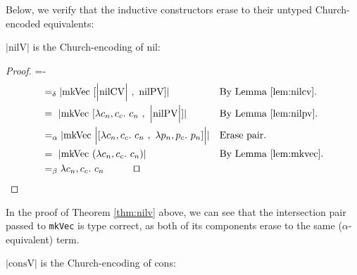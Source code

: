 \documentclass[a4paper,envcountsame,envcountsect]{llncs}
\newcommand{\eqed}[0]{\tag*{\qed}}
\newcommand{\refthm}[1]{Theorem \ref{thm:#1}}
\newcommand{\labthm}[1]{\label{thm:#1}}
\newcommand{\reflem}[1]{Lemma \ref{lem:#1}}
\newcommand{\earg}[1]{\,\,#1}
\newcommand{\erase}[1]{\ensuremath{\lvert #1 \rvert}}
\newcommand{\Erase}[1]{\ensuremath{\Big\lvert #1 \Big\rvert}}
\newcommand{\pair}[2]{\ensuremath{[ #1 ~,~ #2]}}
\newcommand{\fun}[1]{\lambda #1 .~}
\newcommand{\by}[1]{\text{#1}}
\newcommand{\name}[1]{\textrm{#1}}
\begin{document}
Below, we verify that the inductive constructors erase to their untyped
Church-encoded equivalents:

\begin{theorem}
\erase{\name{nilV}} is the Church-encoding of nil:
\labthm{nilv}
\end{theorem}

\begin{proof}
{\small
\abovedisplayskip=-\baselineskip
\begin{align*}
  &=_\delta \erase{
    \name{mkVec} \earg \pair{ \Erase{\name{nilCV}} }{ \name{nilPV} }
  }
  && \by{By \reflem{nilcv}.}
  \\
  &=~ \erase{
    \name{mkVec} \earg \pair{ \fun{c_n, c_c} c_n }{ \Erase{\name{nilPV}} }
  }
  && \by{By \reflem{nilpv}.}
  \\
  &=_\alpha \erase{
    \name{mkVec} \earg \Erase{\pair{ \fun{c_n, c_c} c_n }{ \fun{p_n, p_c} p_n }}
  }
  && \by{Erase pair.}
  \\
  &=~ \erase{
    \name{mkVec} \earg (\fun{c_n, c_c} c_n)
  }
  && \by{By \reflem{mkvec}.}
  \\
  &=_\beta \fun{c_n, c_c} c_n
  \eqed
\end{align*}}
\end{proof}

In the proof of \refthm{nilv} above, we can see that the intersection
pair passed to \texttt{mkVec} is type correct, as both of its
components erase to the same ($\alpha$-equivalent) term.

\begin{theorem}
\erase{\name{consV}} is the Church-encoding of cons:
\labthm{consv}
\end{theorem}
\end{document}

